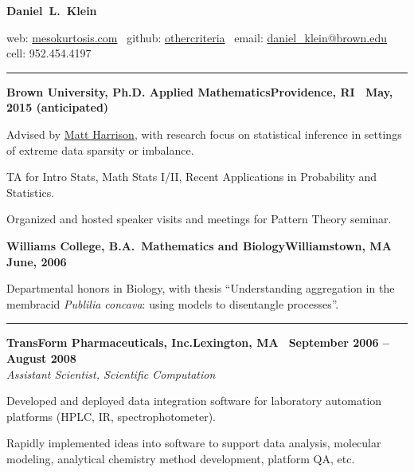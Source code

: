\documentclass{article}
\newcommand{\ressection}[1]{\noindent{\large\textbf{#1}}\vspace{2pt}\hrule\vspace{4pt}}
\newcommand{\leftandright}[2]{\noindent\textbf{#1}\hfill\textbf{#2}}
\begin{document}
\sffamily

\begin{center}
\textbf{\huge{Daniel~L.~Klein}}

web: \href{http://mesokurtosis.com}{mesokurtosis.com}
\textbullet\, github: \href{https://gititbub.com/othercriteria}{othercriteria}
\textbullet\, email: \href{mailto:daniel_klein@brown.edu}{daniel\_klein@brown.edu}
\textbullet\, cell: 952.454.4197
\end{center}

\ressection{Education}

\leftandright{Brown University, \textmd{Ph.D. Applied
    Mathematics}}{Providence, RI \textbullet\ May, 2015 (anticipated)}
\begin{itemize*}
\item Advised by \href{http://www.dam.brown.edu/people/harrison}{Matt
    Harrison}, with research focus on statistical inference in
  settings of extreme data sparsity or imbalance.
\item TA for Intro Stats, Math Stats I/II, Recent Applications in
  Probability and Statistics.
\item Organized and hosted speaker visits and meetings for Pattern
  Theory seminar.
\end{itemize*}

\leftandright{Williams College, \textmd{B.A.\ Mathematics and
    Biology}}{Williamstown, MA \textbullet\, June, 2006}
\begin{itemize*}
\item Departmental honors in Biology, with thesis ``Understanding
  aggregation in the membracid \emph{Publilia concava}: using models
  to disentangle processes''.
\end{itemize*}

\vspace{1.0em}

\ressection{Work experience}

\leftandright{TransForm Pharmaceuticals, Inc.}{Lexington, MA
  \textbullet\, September 2006 -- August 2008} \\
\textit{Assistant Scientist, Scientific Computation}

\begin{itemize*}
\item Developed and deployed data integration software for laboratory
  automation platforms (HPLC, IR, spectrophotometer).
\item Rapidly implemented ideas into software to support data
  analysis, molecular modeling, analytical chemistry method
  development, platform QA, etc.
\end{itemize*}
\end{document}
